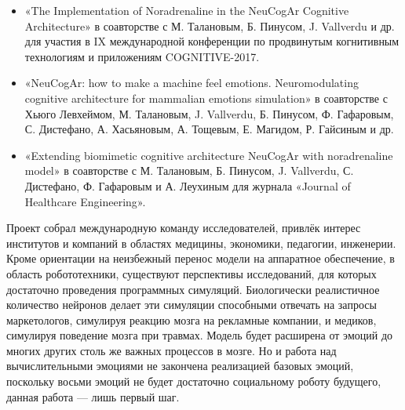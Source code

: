 \begin{itemize}
\item «The Implementation of Noradrenaline in the NeuCogAr Cognitive Architecture» в соавторстве с М. Талановым, Б. Пинусом, J. Vallverdu и др. для участия в IX международной конференции по продвинутым когнитивным технологиям и приложениям COGNITIVE-2017.
\item «NeuCogAr: how to make a machine feel emotions. Neuromodulating cognitive architecture for mammalian emotions simulation» в соавторстве с Хьюго Левхеймом, М. Талановым, J. Vallverdu, Б. Пинусом, Ф. Гафаровым, С. Дистефано, А. Хасьяновым, А. Тощевым, Е. Магидом, Р. Гайсиным и др.
\item «Extending biomimetic cognitive architecture NeuCogAr with noradrenaline model» в соавторстве с М. Талановым, Б. Пинусом, J. Vallverdu, С. Дистефано, Ф. Гафаровым и А. Леухиным для журнала «Journal of Healthcare Engineering».
\end{itemize}


Проект собрал международную команду исследователей, привлёк интерес институтов и компаний в областях медицины, экономики, педагогии, инженерии. Кроме ориентации на неизбежный перенос модели на аппаратное обеспечение, в область робототехники, существуют перспективы исследований, для которых достаточно проведения программных симуляций. Биологически реалистичное количество нейронов делает эти симуляции способными отвечать на запросы маркетологов, симулируя реакцию мозга на рекламные компании, и медиков, симулируя поведение мозга при травмах. Модель будет расширена от эмоций до многих других столь же важных процессов в мозге. Но и работа над вычислительными эмоциями не закончена реализацией базовых эмоций, поскольку восьми эмоций не будет достаточно социальному роботу будущего, данная работа --- лишь первый шаг.